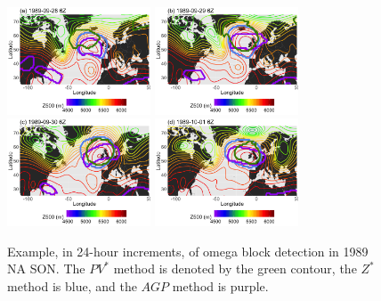 \documentclass[smallextended]{svjour3}       %
\numberwithin{equation}{section}
\begin{document}
\begin{figure}
\centering
\includegraphics[width=0.38\textwidth]{fig8a}
\includegraphics[width=0.38\textwidth]{fig8b}\\
\includegraphics[width=0.38\textwidth]{fig8c}
\includegraphics[width=0.38\textwidth]{fig8d}
\caption{Example, in 24-hour increments, of omega block detection in 1989 NA SON. The $PV^*$ method is denoted by the green contour, the $Z^*$ method is blue, and the $AGP$ method is purple.}\label{pvdiff}
\end{figure}
\end{document}
